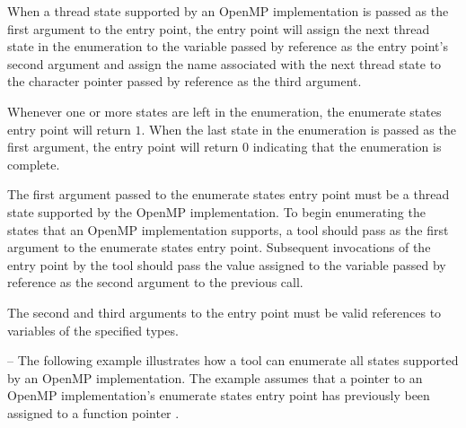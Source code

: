 When a thread state supported by an OpenMP implementation is passed
as the first argument to the entry point,
the entry point will assign the next thread state in the enumeration to
the variable passed by reference as the entry point's second argument
and assign the name associated with the next thread state
to the character pointer passed by reference as the third argument.
 
Whenever one or more states are left in the enumeration, 
the enumerate states entry point will return $1$.
When the last state in the enumeration is passed 
as the first argument, the entry point will return $0$ 
indicating that the enumeration is complete.

\begin{comment}
For instance, a particular OpenMP implementation may want to 
provide more detail about the nature of runtime overhead, 
e.g., to differentiate between overhead associated with setting up 
parallel regions
and overhead associated with setting up tasks. 
To enable a tool to identify all states that an OpenMP implementation
supports, the following interface for enumerating all states that may be reported by the runtime that is being used.
\end{comment}

\constraints

The first argument passed to the enumerate states entry point must be
a thread state supported by the OpenMP implementation.  
To begin enumerating the states that an OpenMP implementation supports,
a tool should pass  as the
first argument to the enumerate states entry point.
Subsequent invocations of the entry point by the tool
should pass the value 
assigned to the variable passed by reference as the second argument to the previous call.

The second and third arguments to the entry point must be valid
references to variables of the specified types.

\vspace{2ex}

\notestart
\noteheader -- The following example illustrates how a tool can 
enumerate all states supported by an OpenMP implementation.
The example assumes that a pointer to an OpenMP implementation's enumerate
states entry point has previously been assigned to a function pointer
.

